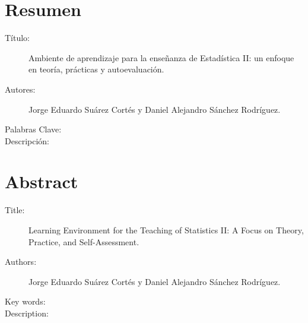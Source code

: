 \documentclass[letter,oneside,12pt,spanish]{report}
\begin{document}
\chapter*{Resumen}

\footnotesize{
\begin{description}
  \item[Título:] Ambiente de aprendizaje para la enseñanza de Estadística II: un enfoque en teoría, prácticas y autoevaluación.
  \item[Autores:] Jorge Eduardo Suárez Cortés y Daniel Alejandro Sánchez Rodríguez.
  \item[Palabras Clave:] 
  \item[Descripción:]  
  
  
  
\end{description}}\normalsize


\newpage

\chapter*{Abstract}

\footnotesize{
\begin{description}
  \item[Title:] Learning Environment for the Teaching of Statistics II: A Focus on Theory, Practice, and Self-Assessment.
  \item[Authors:] Jorge Eduardo Suárez Cortés y Daniel Alejandro Sánchez Rodríguez.
  \item[Key words:] 
  \item[Description:] 
  
  
  
  
  

\end{description}}\normalsize


\newpage
\end{document}
